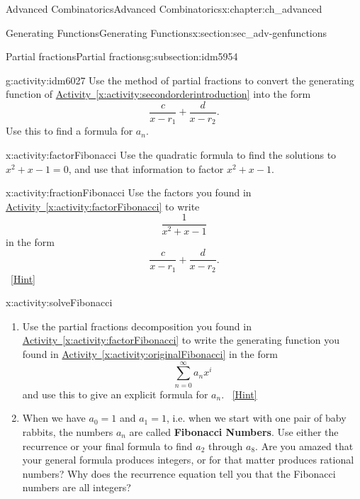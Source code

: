 \documentclass[oneside,10pt,]{book}
\newcommand{\terminology}[1]{\textbf{#1}}
\numberwithin{equation}{chapter}
\begin{document}
\begin{chapterptx}{Advanced Combinatorics}{}{Advanced Combinatorics}{}{}{x:chapter:ch_advanced}
\begin{sectionptx}{Generating Functions}{}{Generating Functions}{}{}{x:section:sec_adv-genfunctions}
\begin{subsectionptx}{Partial fractions}{}{Partial fractions}{}{}{g:subsection:idm5954}
\begin{activity}{}{g:activity:idm6027}%
Use the method of partial fractions to convert the generating function of \hyperref[x:activity:secondorderintroduction]{Activity~\ref{x:activity:secondorderintroduction}} into the form%
\begin{equation*}
\frac{c}{x-r_1} + \frac{d}{x-r_2}\text{.}
\end{equation*}
Use this to find a formula for \(a_n\).%
\end{activity}
\begin{activity}{}{x:activity:factorFibonacci}%
Use the quadratic formula to find the solutions to \(x^2+x-1=0\), and use that information to factor \(x^2+x-1\).%
\end{activity}
\begin{activity}{}{x:activity:fractionFibonacci}%
Use the factors you found in \hyperref[x:activity:factorFibonacci]{Activity~\ref{x:activity:factorFibonacci}} to write%
\begin{equation*}
\frac{1}{x^2+x-1}
\end{equation*}
in the form%
\begin{equation*}
\frac{c}{x-r_1} + \frac{d}{x-r_2}.
\end{equation*}
%
\qquad~\hfill{\tiny\hyperlink{g:hint:idm6063-back}{[Hint]}}\end{activity}
%
\begin{activity}{}{x:activity:solveFibonacci}%
\begin{enumerate}[font=\bfseries,label=(\alph*),ref=\alph*]
\item{}Use the partial fractions decomposition you found in \hyperref[x:activity:factorFibonacci]{Activity~\ref{x:activity:factorFibonacci}} to write the generating function you found in \hyperref[x:activity:originalFibonacci]{Activity~\ref{x:activity:originalFibonacci}} in the form%
\begin{equation*}
\sum_{n=0}^\infty a_nx^i
\end{equation*}
and use this to give an explicit formula for \(a_n\).%
\qquad~\hfill{\tiny\hyperlink{g:hint:idm6089-back}{[Hint]}}\item{}When we have \(a_0=1\) and \(a_1=1\), i.e. when we start with one pair of baby rabbits, the numbers \(a_n\) are called \terminology{Fibonacci Numbers}.  Use either the recurrence or your final formula to find \(a_2\) through \(a_8\).  Are you amazed that your general formula produces integers, or for that matter produces rational numbers?  Why does the recurrence equation tell you that the Fibonacci numbers are all integers?%

\end{enumerate}
\end{activity}
\end{subsectionptx}
\end{sectionptx}
\end{chapterptx}
\end{document}
